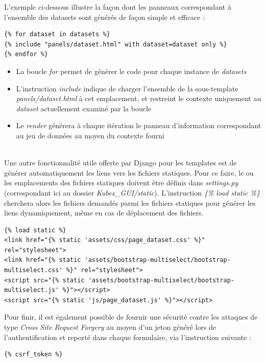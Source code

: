 \documentclass[a4paper]{report}
\begin{document}
L'exemple ci-dessous illustre la façon dont les panneaux correspondant à l'ensemble des datasets sont générés de façon simple et efficace :

\begin{verbatim}
{% for dataset in datasets %}
{% include "panels/dataset.html" with dataset=dataset only %}
{% endfor %}
\end{verbatim}

\begin{itemize}
	\item La boucle \emph{for} permet de générer le code pour chaque instance de \emph{datasets}
	\item L'instruction \emph{include} indique de charger l'ensemble de la sous-template \emph{panels/dataset.html} à cet emplacement, et restreint le contexte uniquement au \emph{dataset} actuellement examiné par la boucle
	\item Le \emph{render} générera à chaque itération le panneau d'information correspondant au jeu de données au moyen du contexte fourni
\end{itemize}
~\\
Une autre fonctionnalité utile offerte par Django pour les templates est de générer automatiquement les liens vers les fichiers statiques. Pour ce faire, le ou les emplacements des fichiers statiques doivent être définis dans \emph{settings.py} (correspondant ici au dossier \emph{Kubex\_GUI/static}). L'instruction \emph{\{\% load static \%\}} cherchera alors les fichiers demandés parmi les fichiers statiques pour générer les liens dynamiquement, même en cas de déplacement des fichiers.

\begin{verbatim}
{% load static %}
<link href="{% static 'assets/css/page_dataset.css' %}" rel="stylesheet">
<link href="{% static 'assets/bootstrap-multiselect/bootstrap-multiselect.css' %}" rel="stylesheet">
<script src="{% static 'assets/bootstrap-multiselect/bootstrap-multiselect.js' %}"></script>
<script src="{% static 'js/page_dataset.js' %}"></script>
\end{verbatim}

Pour finir, il est également possible de fournir une sécurité contre les attaques de type \emph{Cross Site Request Forgery} au moyen d'un jeton généré lors de l'authentification et reporté dans chaque formulaire, via l'instruction suivante :

\begin{verbatim}
{% csrf_token %}
\end{verbatim}
\end{document}
